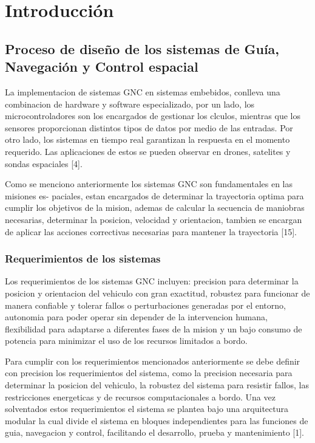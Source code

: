 
\chapter{Introducción}
\label{chp:intro}

\section{Proceso de diseño de los sistemas de Guía, Navegación y Control espacial}

La implementacion de sistemas GNC en sistemas embebidos, conlleva una combinacion de
hardware y software especializado, por un lado, los microcontroladores son los encargados de
gestionar los clculos, mientras que los sensores proporcionan distintos tipos de datos por medio
de las entradas. Por otro lado, los sistemas en tiempo real garantizan la respuesta en el momento
requerido. Las aplicaciones de estos se pueden observar en drones, satelites y sondas espaciales
[4].

Como se menciono anteriormente los sistemas GNC son fundamentales en las misiones es-
paciales, estan encargados de determinar la trayectoria optima para cumplir los objetivos de
la mision, ademas de calcular la secuencia de maniobras necesarias, determinar la posicion,
velocidad y orientacion, tambien se encargan de aplicar las acciones correctivas necesarias para
mantener la trayectoria [15].

\subsection{Requerimientos de los sistemas}

Los requerimientos de los sistemas GNC incluyen: precision para determinar la posicion
y orientacion del vehiculo con gran exactitud, robustez para funcionar de manera confiable
y tolerar fallos o perturbaciones generadas por el entorno, autonomia para poder operar sin
depender de la intervencion humana, flexibilidad para adaptarse a diferentes fases de la mision
y un bajo consumo de potencia para minimizar el uso de los recursos limitados a bordo.

Para cumplir con los requerimientos mencionados anteriormente se debe definir con precision
los requerimientos del sistema, como la precision necesaria para determinar la posicion del
vehiculo, la robustez del sistema para resistir fallos, las restricciones energeticas y de recursos
computacionales a bordo. Una vez solventados estos requerimientos el sistema se plantea bajo
una arquitectura modular la cual divide el sistema en bloques independientes para las funciones
de guia, navegacion y control, facilitando el desarrollo, prueba y mantenimiento [1].

